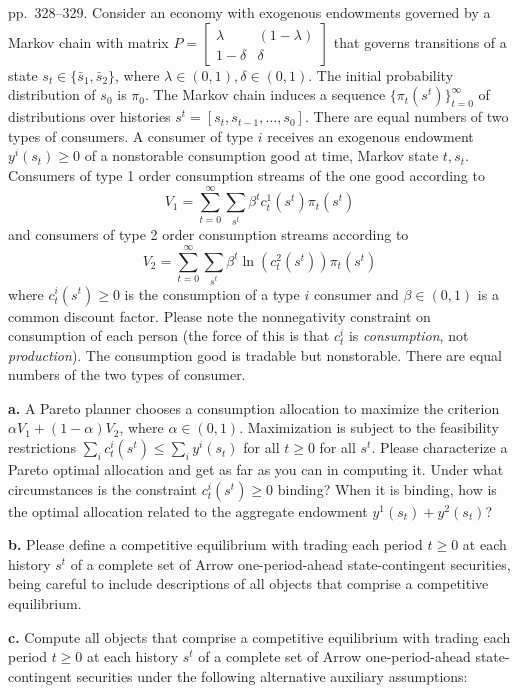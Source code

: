 \documentclass[12pt, letterpaper]{article}
\begin{document}
\begin{tcolorbox}[oddbox,title={Exercise 8.27 \quad Corners}]
\begin{tcolorbox}[questionbox]
pp.~328--329. Consider an economy with exogenous endowments governed by a Markov chain with matrix
$P=\begin{bmatrix}\lambda&(1-\lambda)\\1-\delta&\delta\end{bmatrix}$ that governs transitions of a state
$s_t\in\{\bar s_1,\bar s_2\}$, where $\lambda\in(0,1),\delta\in(0,1)$. The initial probability distribution of $s_0$ is
$\pi_0$. The Markov chain induces a sequence $\{\pi_t(s^t)\}_{t=0}^\infty$ of distributions over histories
$s^t=[s_t,s_{t-1},\dots,s_0]$. There are equal numbers of two types of consumers. A consumer of type $i$ receives
an exogenous endowment $y^i(s_t)\ge0$ of a nonstorable consumption good at time, Markov state $t,s_t$.
Consumers of type 1 order consumption streams of the one good according to
\[
V_1=\sum_{t=0}^\infty\sum_{s^t}\beta^tc^1_t(s^t)\pi_t(s^t)
\]
and consumers of type 2 order consumption streams according to
\[
V_2=\sum_{t=0}^\infty\sum_{s^t}\beta^t\ln(c^2_t(s^t))\pi_t(s^t)
\]
where $c^i_t(s^t)\ge0$ is the consumption of a type $i$ consumer and $\beta\in(0,1)$ is a common discount factor.
Please note the nonnegativity constraint on consumption of each person (the force of this is that $c^i_t$ is
\emph{consumption}, not \emph{production}). The consumption good is tradable but nonstorable. There are equal
numbers of the two types of consumer.

\textbf{a.} A Pareto planner chooses a consumption allocation to maximize the criterion
$\alpha V_1+(1-\alpha)V_2$, where $\alpha\in(0,1)$. Maximization is subject to the feasibility restrictions
$\sum_ic^i_t(s^t)\le\sum_iy^i(s_t)$ for all $t\ge0$ for all $s^t$. Please characterize a Pareto optimal allocation and
get as far as you can in computing it. Under what circumstances is the constraint $c^i_t(s^t)\ge0$ binding?
When it is binding, how is the optimal allocation related to the aggregate endowment $y^1(s_t)+y^2(s_t)$?

\textbf{b.} Please define a competitive equilibrium with trading each period $t\ge0$ at each history $s^t$ of a
complete set of Arrow one-period-ahead state-contingent securities, being careful to include descriptions of
all objects that comprise a competitive equilibrium.

\textbf{c.} Compute all objects that comprise a competitive equilibrium with trading each period $t\ge0$ at each
history $s^t$ of a complete set of Arrow one-period-ahead state-contingent securities under the following
alternative auxiliary assumptions:


\end{tcolorbox}
\end{tcolorbox}
\end{document}
